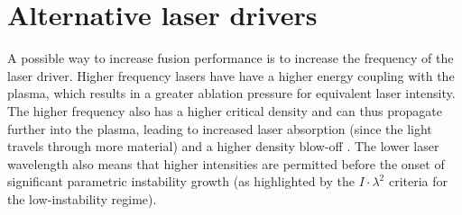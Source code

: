 






\section{Alternative laser drivers} \label{sec:AlternativeDrivers}

A possible way to increase fusion performance is to increase the frequency of the laser driver. Higher frequency lasers have have a higher energy coupling with the plasma, which results in a greater ablation pressure for equivalent laser intensity. The higher frequency also has a higher critical density and can thus propagate further into the plasma, leading to increased laser absorption (since the light travels through more material) and a higher density blow-off \cite{Obenschain2020}. The lower laser wavelength also means that higher intensities are permitted before the onset of significant parametric instability growth \cite{Montgomery2016} (as highlighted by the $I \cdot \lambda^2$ criteria for the low-instability regime). 

